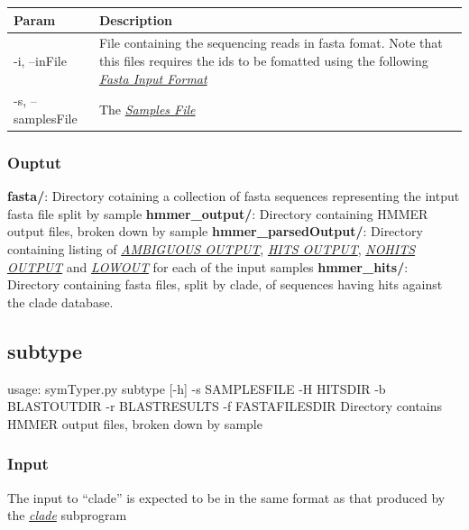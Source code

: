 \documentclass[letterpaper,10pt,english]{sphinxmanual}
\begin{document}
\begin{tabulary}{\linewidth}{|L|L|}
\hline
\textsf{\relax 
Param
} & \textsf{\relax 
Description
}\\
\hline
-i, --inFile
 & 
File containing the sequencing reads in fasta fomat. Note that this files requires the ids to be fomatted using the following {\hyperref[defs:inputformat]{\emph{Fasta Input Format}}}
\\

-s, --samplesFile
 & 
The {\hyperref[defs:samplefile]{\emph{Samples File}}}
\\
\hline\end{tabulary}



\subsubsection{Ouptut}
\label{CommandLine:ouptut}
\textbf{fasta/}: Directory cotaining a collection of fasta sequences representing the intput fasta file split by sample
\textbf{hmmer\_output/}: Directory containing HMMER output files, broken down by sample
\textbf{hmmer\_parsedOutput/}: Directory containing listing of {\hyperref[defs:ambiguousout]{\emph{AMBIGUOUS OUTPUT}}}, {\hyperref[defs:hitsout]{\emph{HITS OUTPUT}}}, {\hyperref[defs:nohitsout]{\emph{NOHITS OUTPUT}}} and {\hyperref[defs:lowout]{\emph{LOWOUT}}} for each of the input samples
\textbf{hmmer\_hits/}: Directory containing fasta files, split by clade, of sequences having hits against the clade database.


\subsection{subtype}
\label{CommandLine:subtype}\label{CommandLine:id2}
usage: symTyper.py subtype {[}-h{]} -s SAMPLESFILE -H HITSDIR -b BLASTOUTDIR -r BLASTRESULTS -f FASTAFILESDIR
Directory contains HMMER output files, broken down by sample


\subsubsection{Input}
\label{CommandLine:id3}
The input to ``clade'' is expected to be in the same format as that produced by the {\hyperref[CommandLine:clade]{\emph{clade}}} subprogram
\end{document}
